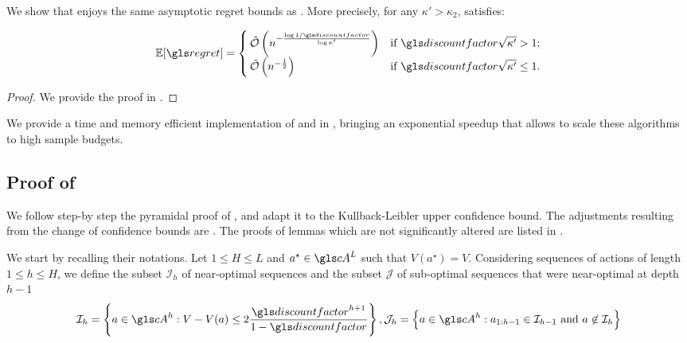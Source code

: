 \begin{theorem}
	\label{thm:regret-kl-olop}
	\begin{leftbar}[theorembar]
	We show that \KLOLOP enjoys the same asymptotic regret bounds as \OLOP. More precisely, for any $\kappa' > \kappa_2$, \KLOLOP satisfies:
	
	
	\begin{equation*}
	\expectedvalue [\regret] = \begin{cases}
	\tilde{\cO}\left(n^{-\frac{\log 1/\discount}{\log \kappa'}}\right) & \text{if}\ \discount\sqrt{\kappa'} > 1; \\
	\tilde{\cO}\left(n^{-\frac{1}{2}}\right) & \text{if}\ \discount\sqrt{\kappa'} \leq 1.
	\end{cases}
	\end{equation*}
	\end{leftbar}
\end{theorem}
\begin{proof}
	We provide the proof in .
\end{proof}

We provide a time and memory efficient implementation of \OLOP and \KLOLOP in , bringing an exponential speedup that allows to scale these algorithms to high sample budgets.

\subsection{Proof of }
\label{sec:regret-proof}

We follow step-by step the pyramidal proof of \citep{Bubeck2010}, and adapt it to the Kullback-Leibler upper confidence bound. The adjustments resulting from the change of confidence bounds are . The proofs of lemmas which are not significantly altered are listed in . 

We start by recalling their notations.
Let $1 \leq H \leq L$ and $a^{\star} \in \cA^L$ such that $V(a^{\star}) = V$.
Considering sequences of actions of length $1 \leq h \leq H$, we define the subset $\mathcal{I}_h$ of near-optimal sequences and the subset $\mathcal{J}$ of sub-optimal sequences that were near-optimal at depth $h-1$
\begin{equation*}
\mathcal{I}_h = \left\{a \in \cA^h: V - V(a) \leq 2\frac{\discount^{h+1}}{1-\discount}\right\}, \mathcal{J}_h = \left\{a \in \cA^h: a_{1:h-1} \in \mathcal{I}_{h-1} \text{ and } a \not\in \mathcal{I}_h\right\}
\end{equation*}

